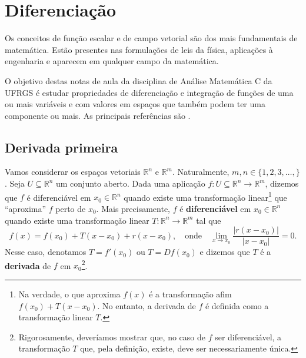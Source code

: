 
\chapter{Diferenciação}\label{cap:diferenciação}


Os conceitos de função escalar e de campo vetorial são dos mais fundamentais de matemática. Estão presentes nas formulações de leis da física, aplicações à engenharia e aparecem em qualquer campo da matemática.

O objetivo destas notas de aula da disciplina de Análise Matemática C da UFRGS é estudar propriedades de diferenciação e integração de funções de uma ou mais variáveis e com valores em espaços que também podem ter uma componente ou mais. As principais referências são \cite{doCa-15,Lima-15,Rudi-64,Spiv-65}.


\section{Derivada primeira}\label{sec:derivada_primeira}

Vamos considerar os espaços vetoriais $\mathbb{R}^n$ e $\mathbb{R}^m$. Naturalmente, $m, n \in \{ 1,2,3,\dots,\}$. Seja $U \subseteq \mathbb{R}^n$ um conjunto aberto. Dada uma aplicação $f: U \subseteq \mathbb{R}^n \to \mathbb{R}^m$, dizemos que $f$ é diferenciável em $x_0 \in \mathbb{R}^n$ quando existe uma transformação linear\footnote{Na verdade, o que aproxima $f(x)$ é a transformação afim $f(x_0) + T (x-x_0)$. No entanto, a derivada de $f$ é definida como a transformação linear $T$.} que ``aproxima'' $f$ perto de $x_0$. Mais precisamente, $f$ é \textbf{diferenciável} em $x_0 \in \mathbb{R}^n$ quando existe uma transformação linear $T: \mathbb{R}^n \to \mathbb{R}^m$ tal que
\[
f(x) = f(x_0) + T (x-x_0) + r(x-x_0), \quad \text{onde} \quad \lim_{x \to x_0} \frac{\big|r(x-x_0)\big|}{|x-x_0|} = 0.
\] Nesse caso, denotamos $T = f'(x_0)$ ou $T = Df(x_0)$ e dizemos que $T$ é a \textbf{derivada} de $f$ em $x_0$\footnote{Rigorosamente, deveríamos mostrar que, no caso de $f$ ser diferenciável, a transformação $T$ que, pela definição, existe, deve ser necessariamente única.}.

